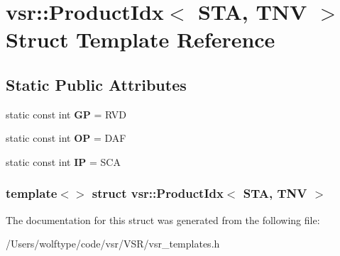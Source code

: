 \hypertarget{structvsr_1_1_product_idx_3_01_s_t_a_00_01_t_n_v_01_4}{\section{vsr\-:\-:Product\-Idx$<$ S\-T\-A, T\-N\-V $>$ Struct Template Reference}
\label{structvsr_1_1_product_idx_3_01_s_t_a_00_01_t_n_v_01_4}
}
\subsection*{Static Public Attributes}
\begin{DoxyCompactItemize}
\item 
\hypertarget{structvsr_1_1_product_idx_3_01_s_t_a_00_01_t_n_v_01_4_a66f5c80d9fbfe811a863d34b27e11148}{static const int {\bfseries G\-P} = R\-V\-D}\label{structvsr_1_1_product_idx_3_01_s_t_a_00_01_t_n_v_01_4_a66f5c80d9fbfe811a863d34b27e11148}

\item 
\hypertarget{structvsr_1_1_product_idx_3_01_s_t_a_00_01_t_n_v_01_4_a5186362b5b347a9fbbaa7f2d28bbac92}{static const int {\bfseries O\-P} = D\-A\-F}\label{structvsr_1_1_product_idx_3_01_s_t_a_00_01_t_n_v_01_4_a5186362b5b347a9fbbaa7f2d28bbac92}

\item 
\hypertarget{structvsr_1_1_product_idx_3_01_s_t_a_00_01_t_n_v_01_4_a6fd08e1a38282d306a1b8d9e849f92c3}{static const int {\bfseries I\-P} = S\-C\-A}\label{structvsr_1_1_product_idx_3_01_s_t_a_00_01_t_n_v_01_4_a6fd08e1a38282d306a1b8d9e849f92c3}

\end{DoxyCompactItemize}
\subsubsection*{template$<$$>$ struct vsr\-::\-Product\-Idx$<$ S\-T\-A, T\-N\-V $>$}



The documentation for this struct was generated from the following file\-:\begin{DoxyCompactItemize}
\item 
/\-Users/wolftype/code/vsr/\-V\-S\-R/vsr\-\_\-templates.\-h\end{DoxyCompactItemize}

